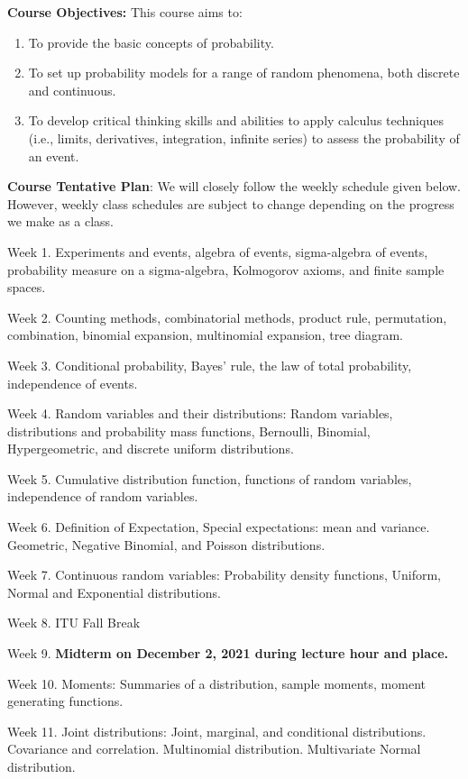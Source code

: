 \documentclass[
  12pt,
]{article}
\providecommand{\tightlist}{%
  \setlength{\itemsep}{0pt}\setlength{\parskip}{0pt}}
\begin{document}
\textbf{Course Objectives:} This course aims to:

\begin{enumerate}
\def\labelenumi{\arabic{enumi}.}
\tightlist
\item
  To provide the basic concepts of probability.
\item
  To set up probability models for a range of random phenomena, both
  discrete and continuous.
\item
  To develop critical thinking skills and abilities to apply calculus
  techniques (i.e., limits, derivatives, integration, infinite series)
  to assess the probability of an event.
\end{enumerate}

\textbf{Course Tentative Plan}: We will closely follow the weekly
schedule given below. However, weekly class schedules are subject to
change depending on the progress we make as a class.

Week 1. Experiments and events, algebra of events, sigma-algebra of
events, probability measure on a sigma-algebra, Kolmogorov axioms, and
finite sample spaces.

Week 2. Counting methods, combinatorial methods, product rule,
permutation, combination, binomial expansion, multinomial expansion,
tree diagram.

Week 3. Conditional probability, Bayes' rule, the law of total
probability, independence of events.

Week 4. Random variables and their distributions: Random variables,
distributions and probability mass functions, Bernoulli, Binomial,
Hypergeometric, and discrete uniform distributions.

Week 5. Cumulative distribution function, functions of random variables,
independence of random variables.

Week 6. Definition of Expectation, Special expectations: mean and
variance. Geometric, Negative Binomial, and Poisson distributions.

Week 7. Continuous random variables: Probability density functions,
Uniform, Normal and Exponential distributions.

Week 8. ITU Fall Break

Week 9. \textbf{\textbf{Midterm on December 2, 2021 during lecture hour
and place.}}

Week 10. Moments: Summaries of a distribution, sample moments, moment
generating functions.

Week 11. Joint distributions: Joint, marginal, and conditional
distributions. Covariance and correlation. Multinomial distribution.
Multivariate Normal distribution.
\end{document}
